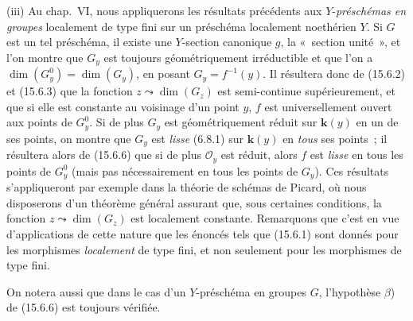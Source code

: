 \begin{remarks}[15.6.10]
(iii) Au chap.~VI, nous appliquerons les résultats précédents aux $Y$-\emph{préschémas en groupes} localement de type fini sur un préschéma localement noethérien $Y$. Si $G$ est un tel préschéma, il existe une $Y$-section canonique $g$, la «~section unité~», et l'on montre que $G_y$ est toujours géométriquement irréductible et que l'on a $\dim(G_y^0)=\dim(G_y)$, en posant $G_y=f^{-1}(y)$. Il résultera donc de (15.6.2) et (15.6.3) que la fonction $z\leadsto\dim(G_z)$ est semi-continue supérieurement, et que si elle est constante au voisinage d'un point $y$, $f$ est universellement ouvert aux points de $G_y^0$. Si de plus $G_y$ est géométriquement réduit sur $\boldsymbol{k}(y)$ en un de ses points, on montre que $G_y$ est \emph{lisse} (6.8.1) sur $\boldsymbol{k}(y)$ en \emph{tous} ses points~; il résultera alors de (15.6.6) que si de plus $\mathcal O_y$ est réduit, alors $f$ est \emph{lisse} en tous les points de $G_y^0$ (mais pas nécessairement en tous les points de $G_y$). Ces résultats s'appliqueront par exemple dans la théorie de schémas de Picard, où nous disposerons d'un théorème général assurant que, sous certaines conditions, la fonction $z\leadsto\dim(G_z)$ est localement constante. Remarquons que c'est en vue d'applications de cette nature que les énoncés tels que (15.6.1) sont donnés pour les morphismes \emph{localement} de type fini, et non seulement pour les morphismes de type fini.

On notera aussi que dans le cas d'un $Y$-préschéma en groupes $G$, l'hypothèse $\beta$) de (15.6.6) est toujours vérifiée.
\end{remarks}


